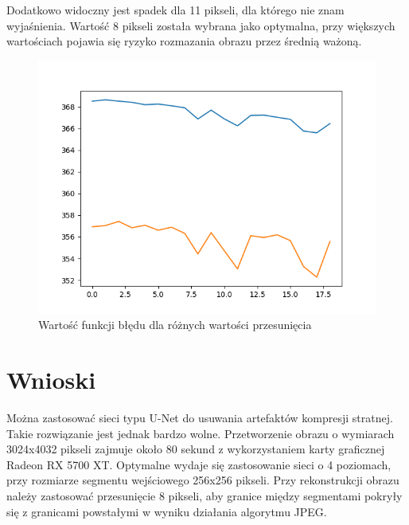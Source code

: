 \documentclass[a4paper, 12pt]{article}
\begin{document}
Dodatkowo widoczny jest spadek dla 11 pikseli, dla którego nie znam wyjaśnienia.
Wartość 8 pikseli została wybrana jako optymalna, przy większych wartościach pojawia się ryzyko rozmazania obrazu przez średnią ważoną.
\begin{figure}[h!]
\begin{center}
	\includegraphics[width=0.7\columnwidth]{overlap_and_loss.png}
	\caption{Wartość funkcji błędu dla różnych wartości przesunięcia}
	\label{fig:overlap_and_loss}
\end{center}
\end{figure}
\section{Wnioski}
Można zastosować sieci typu U-Net do usuwania artefaktów kompresji stratnej.
Takie rozwiązanie jest jednak bardzo wolne. Przetworzenie obrazu o wymiarach 3024x4032 pikseli zajmuje około 80 sekund z wykorzystaniem karty graficznej Radeon RX 5700 XT.
Optymalne wydaje się zastosowanie sieci o 4 poziomach, przy rozmiarze segmentu wejściowego 256x256 pikseli.
Przy rekonstrukcji obrazu należy zastosować przesunięcie 8 pikseli,
aby granice między segmentami pokryły się z granicami powstałymi w wyniku działania algorytmu JPEG.

\newpage

\end{document}
